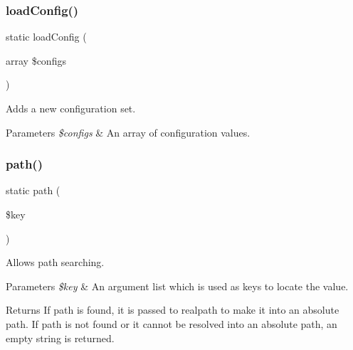 \subsubsection{\texorpdfstring{load\+Config()}{loadConfig()}}
{\footnotesize\ttfamily static load\+Config (\begin{DoxyParamCaption}\item[{array}]{\$configs }\end{DoxyParamCaption})\hspace{0.3cm}{\ttfamily [static]}}

Adds a new configuration set. 
\begin{DoxyParams}{Parameters}
{\em \$configs} & An array of configuration values. \\
\hline
\end{DoxyParams}

\mbox{\label{class_lora_1_1_config_aade770941642defa7b826ff3ad193b4a}} 
\subsubsection{\texorpdfstring{path()}{path()}}
{\footnotesize\ttfamily static path (\begin{DoxyParamCaption}\item[{}]{\$key }\end{DoxyParamCaption})\hspace{0.3cm}{\ttfamily [static]}}

Allows path searching. 
\begin{DoxyParams}{Parameters}
{\em \$key} & An argument list which is used as keys to locate the value. \\
\hline
\end{DoxyParams}
\begin{DoxyReturn}{Returns}
If path is found, it is passed to realpath to make it into an absolute path. If path is not found or it cannot be resolved into an absolute path, an empty string is returned. 
\end{DoxyReturn}

